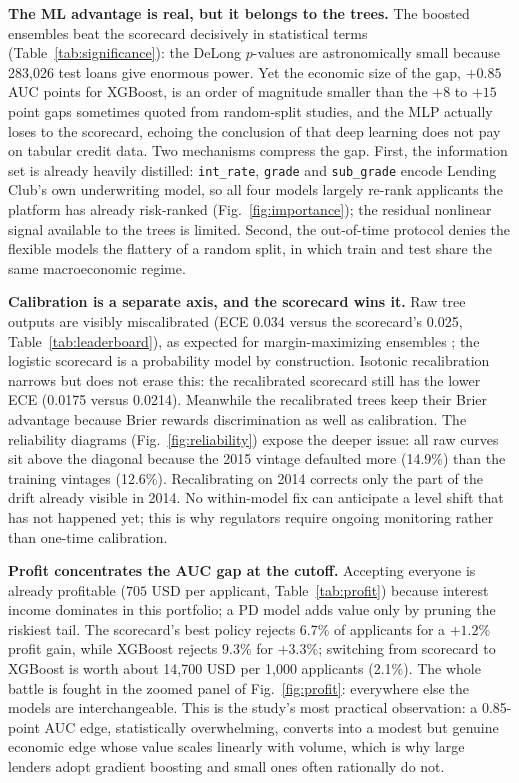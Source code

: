 \documentclass[a4paper,twocolumn,10pt]{article}
\begin{document}
\textbf{The ML advantage is real, but it belongs to the trees.} The boosted ensembles beat the scorecard decisively in statistical terms (Table~\ref{tab:significance}): the DeLong $p$-values are astronomically small because 283{,}026 test loans give enormous power. Yet the economic size of the gap, $+0.85$ AUC points for XGBoost, is an order of magnitude smaller than the $+8$ to $+15$ point gaps sometimes quoted from random-split studies, and the MLP actually loses to the scorecard, echoing the conclusion of \cite{gunnarsson2021} that deep learning does not pay on tabular credit data. Two mechanisms compress the gap. First, the information set is already heavily distilled: \texttt{int\_rate}, \texttt{grade} and \texttt{sub\_grade} encode Lending Club's own underwriting model, so all four models largely re-rank applicants the platform has already risk-ranked (Fig.~\ref{fig:importance}); the residual nonlinear signal available to the trees is limited. Second, the out-of-time protocol denies the flexible models the flattery of a random split, in which train and test share the same macroeconomic regime.

\textbf{Calibration is a separate axis, and the scorecard wins it.} Raw tree outputs are visibly miscalibrated (ECE 0.034 versus the scorecard's 0.025, Table~\ref{tab:leaderboard}), as expected for margin-maximizing ensembles \cite{guo2017}; the logistic scorecard is a probability model by construction. Isotonic recalibration narrows but does not erase this: the recalibrated scorecard still has the lower ECE (0.0175 versus 0.0214). Meanwhile the recalibrated trees keep their Brier advantage because Brier rewards discrimination as well as calibration. The reliability diagrams (Fig.~\ref{fig:reliability}) expose the deeper issue: all raw curves sit above the diagonal because the 2015 vintage defaulted more (14.9\%) than the training vintages (12.6\%). Recalibrating on 2014 corrects only the part of the drift already visible in 2014. No within-model fix can anticipate a level shift that has not happened yet; this is why regulators require ongoing monitoring rather than one-time calibration.

\textbf{Profit concentrates the AUC gap at the cutoff.} Accepting everyone is already profitable ($705$ USD per applicant, Table~\ref{tab:profit}) because interest income dominates in this portfolio; a PD model adds value only by pruning the riskiest tail. The scorecard's best policy rejects 6.7\% of applicants for a $+1.2\%$ profit gain, while XGBoost rejects 9.3\% for $+3.3\%$; switching from scorecard to XGBoost is worth about 14{,}700 USD per 1{,}000 applicants (2.1\%). The whole battle is fought in the zoomed panel of Fig.~\ref{fig:profit}: everywhere else the models are interchangeable. This is the study's most practical observation: a 0.85-point AUC edge, statistically overwhelming, converts into a modest but genuine economic edge whose value scales linearly with volume, which is why large lenders adopt gradient boosting and small ones often rationally do not.
\end{document}
